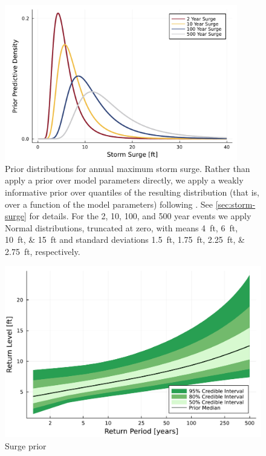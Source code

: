 \documentclass[11pt]{article}
\begin{document}
\begin{figure}
    \centering
    \includegraphics[width=4in]{surge-gev-priors}
    \caption{
        Prior distributions for annual maximum storm surge.
        Rather than apply a prior over model parameters directly, we apply a weakly informative prior over quantiles of the resulting distribution (that is, over a function of the model parameters) following \citet{coles_evd:1996}.
        See \cref{sec:storm-surge} for details.
        For the 2, 10, 100, and 500 year events we apply Normal distributions, truncated at zero, with means \SIlist{4;6;10;15}{ft} and standard deviations \SIlist{1.5;1.75;2.25;2.75}{ft}, respectively.
    }\label{fig:surge-gev-priors}
\end{figure}

\begin{figure}
    \centering
    \includegraphics[width=\textwidth]{surge-prior-return}
    \caption{
        Surge prior
    }\label{fig:surge-prior-return}
\end{figure}
\end{document}
